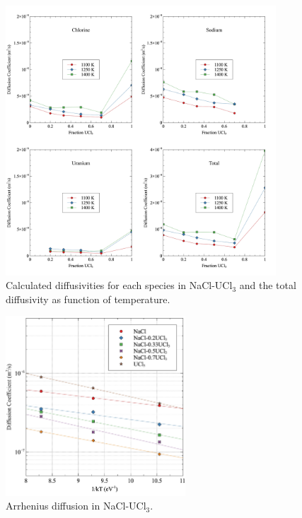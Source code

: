 \documentclass[preprint,3p,10pt,onecolumn,number,sort&compress]{elsarticle}
\begin{document}
{\begin{figure}[htb]
\centering
\includegraphics[width=0.9\textwidth]{fig11.jpg}
\caption{Calculated diffusivities for each species in NaCl-UCl{$_3$} and the total diffusivity as function of temperature.} 
\label{fig:diff}
\end{figure}

\begin{figure}[htb]
\centering
\includegraphics[width=0.6\textwidth]{fig12.jpg}
\caption{Arrhenius diffusion in NaCl-UCl{$_3$}.} 
\label{fig:arrhenius}
\end{figure}

}
\end{document}
